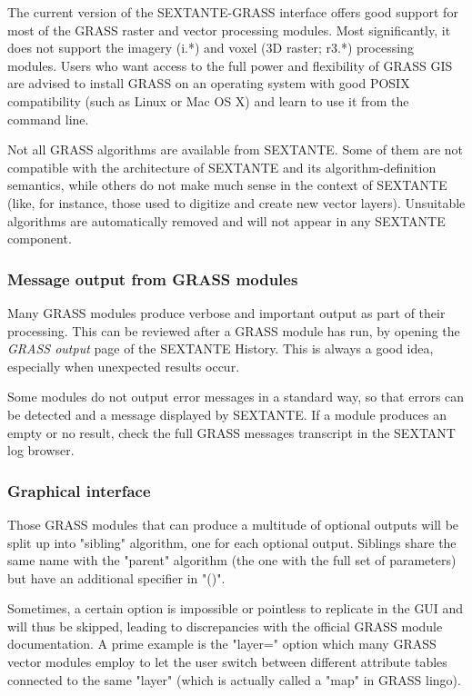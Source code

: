 The current version of the SEXTANTE-GRASS interface offers good support for most of the GRASS raster and vector processing modules. Most significantly, it does not support the imagery (i.*) and voxel (3D raster; r3.*) processing modules. Users who want access to the full power and flexibility of GRASS GIS are advised to install GRASS on an operating system with good POSIX compatibility (such as Linux or Mac OS X) and learn to use it from the command line.

Not all GRASS algorithms are available from SEXTANTE. Some of them are not compatible with the architecture of SEXTANTE and its algorithm-definition semantics, while others do not make much sense in the context of SEXTANTE (like, for instance, those used to digitize and create new vector layers). Unsuitable algorithms are automatically removed and will not appear in any SEXTANTE component.

\subsubsection{Message output from GRASS modules}

Many GRASS modules produce verbose and important output as part of their processing. This can be reviewed after a GRASS module has run, by opening the \emph{GRASS output} page of the SEXTANTE History. This is always a good idea, especially when unexpected results occur.

Some modules do not output error messages in a standard way, so that errors can be detected and a message displayed by SEXTANTE. If a module produces an empty or no result, check the full GRASS messages transcript in the SEXTANT log browser.

\subsubsection{Graphical interface}

Those GRASS modules that can produce a multitude of optional outputs will be split up into "sibling" algorithm, one for each optional output. Siblings share the same name with the "parent" algorithm (the one with the full set of parameters) but have an additional specifier in "()".

Sometimes, a certain option is impossible or pointless to replicate in the GUI and will thus be skipped, leading to discrepancies with the official GRASS module documentation. A prime example is the "layer=" option which many GRASS vector modules employ to let the user switch between different attribute tables connected to the same "layer" (which is actually called a "map" in GRASS lingo).

